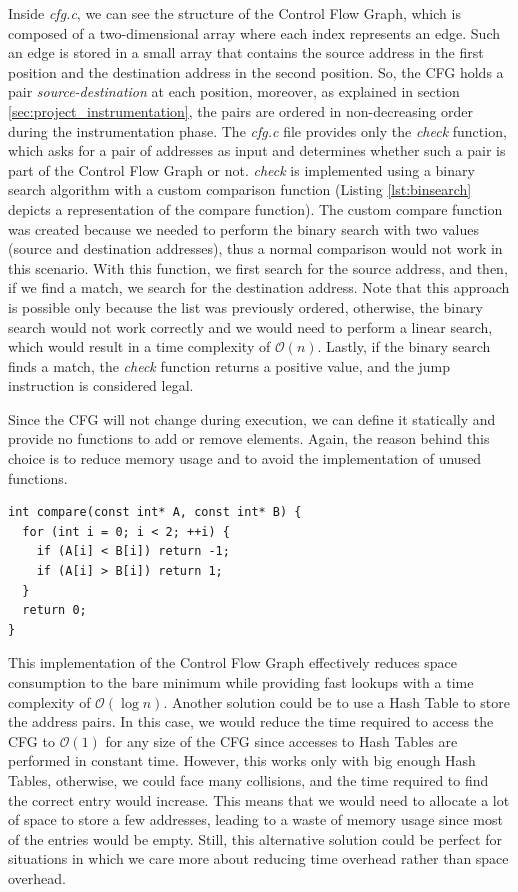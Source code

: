 Inside \textit{cfg.c}, we can see the structure of the Control Flow Graph, which
is composed of a two-dimensional array where each index represents an edge. Such
an edge is stored in a small array that contains the source address in the first
position and the destination address in the second position. So, the CFG holds a
pair \textit{source-destination} at each position, moreover, as explained in
section \ref{sec:project_instrumentation}, the pairs are ordered in non-decreasing
order during the instrumentation phase. The \textit{cfg.c} file provides only the
\textit{check} function, which asks for a pair of addresses as input and determines
whether such a pair is part of the Control Flow Graph or not. \textit{check} is implemented
using a binary search algorithm with a custom comparison function (Listing
\ref{lst:binsearch} depicts a representation of the compare function). The
custom compare function was created because we needed to perform the binary
search with two values (source and destination addresses), thus a normal comparison
would not work in this scenario. With this function, we first search for the source
address, and then, if we find a match, we search for the destination address. Note
that this approach is possible only because the list was previously ordered,
otherwise, the binary search would not work correctly and we would need to perform
a linear search, which would result in a time complexity of $\mathcal{O}(n)$. Lastly,
if the binary search finds a match, the \textit{check} function returns a
positive value, and the jump instruction is considered legal.

Since the CFG will not change during execution, we can define it statically and
provide no functions to add or remove elements. Again, the reason behind this
choice is to reduce memory usage and to avoid the implementation of unused
functions. \\ \begin{lstlisting}[style=CStyle, caption= Comparison function for binary search, label={lst:binsearch}]
int compare(const int* A, const int* B) {
  for (int i = 0; i < 2; ++i) {
    if (A[i] < B[i]) return -1;
    if (A[i] > B[i]) return 1;
  }
  return 0;
}
\end{lstlisting}

This implementation of the Control Flow Graph effectively reduces space
consumption to the bare minimum while providing fast lookups with a time
complexity of $\mathcal{O}(\log{n})$. Another solution could be to use a Hash Table
to store the address pairs. In this case, we would reduce the time required to access
the CFG to $\mathcal{O}(1)$ for any size of the CFG since accesses to Hash Tables
are performed in constant time. However, this works only with big enough Hash Tables,
otherwise, we could face many collisions, and the time required to find the
correct entry would increase. This means that we would need to allocate a lot of
space to store a few addresses, leading to a waste of memory usage since most of
the entries would be empty. Still, this alternative solution could be perfect
for situations in which we care more about reducing time overhead rather than
space overhead.

